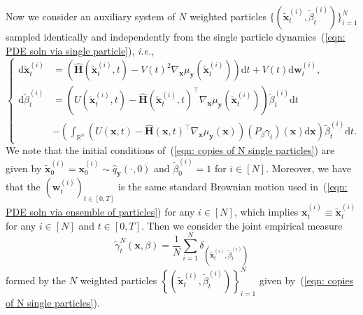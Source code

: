 \documentclass{article}
\numberwithin{equation}{section}
\def\eqref#1{(\ref{#1})}
\newcommand{\dif}{{\mathrm{d}}}
\def\vw{{\bm{w}}}
\def\vx{{\bm{x}}}
\def\vy{{\bm{y}}}
\def\mH{{\bm{H}}}
\begin{document}
Now we consider an auxiliary system of $N$ weighted particles $\{(\widetilde{\vx}^{(i)}_t,\widetilde{\beta}^{(i)}_t)\}_{i=1}^{N}$ sampled identically and independently from the single particle dynamics~\eqref{eqn: PDE soln via single particle}, \emph{i.e.}, 
\begin{equation}
\label{eqn: copies of N single particles} 
\begin{cases}
\dif \widetilde{\vx}^{(i)}_t &= \left(\widehat{\mH}(\widetilde{\vx}^{(i)}_t,t)-V(t)^2\nabla_{\vx}\mu_{\vy}(\widetilde{\vx}^{(i)}_t)\right)\dif t + V(t)\dif \vw^{(i)}_t,\\
\dif \widetilde{\beta}^{(i)}_t &= \left(U(\widetilde{\vx}^{(i)}_t,t) - \widehat{\mH}(\widetilde{\vx}^{(i)}_t,t)^\intercal\nabla_{\vx}\mu_{\vy}(\widetilde{\vx}^{(i)}_t)\right)\widetilde{\beta}^{(i)}_t \dif t \\
&- \left(\displaystyle\int_{\mathbb{R}^n}\left(U(\vx,t) - \widehat{\mH}(\vx,t)^\intercal\nabla_{\vx}\mu_{\vy}(\vx)\right)\left(P_{\beta}\gamma_t\right)(\vx)\dif \vx\right)\widetilde{\beta}^{(i)}_t \dif t.    
\end{cases}
\end{equation}
We note that the initial conditions of~\eqref{eqn: copies of N single particles} are given by $\widetilde{\vx}^{(i)}_0 = \vx^{(i)}_0 \sim \widehat{q}_{\vy}(\cdot,0)$ and $\widetilde{\beta}^{(i)}_0 = 1$ for $i \in [N]$. Moreover, we have that the $\left(\vw^{(i)}_t\right)_{t \in [0,T]}$ is the same standard Brownian motion used in~\eqref{eqn: PDE soln via ensemble of particles} for any $i \in [N]$, which implies $\vx^{(i)}_t \equiv \widetilde{\vx}^{(i)}_t$ for any $i \in [N]$ and $t \in [0,T]$. Then we consider the joint empirical measure 
\begin{equation}
\label{eqn: defn of wasserstein 2 distance}
\widetilde{\gamma}^{N}_t(\vx,\beta) = \frac{1}{N}\sum_{i=1}^{N}\delta_{(\widetilde{\vx}^{(i)}_t,\widetilde{\beta}^{(i)}_t)}    
\end{equation}
formed by the $N$ weighted particles $\left\{\left(\widetilde{\vx}^{(i)}_t, \widetilde{\beta}^{(i)}_t\right)\right\}_{i=1}^{N}$ given by~\eqref{eqn: copies of N single particles}. 
\end{document}

